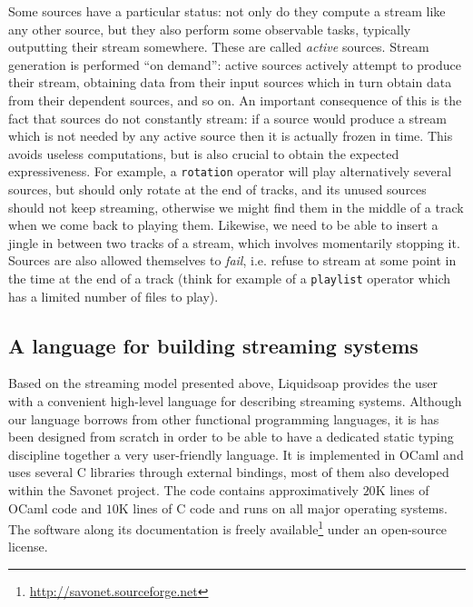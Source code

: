 \documentclass{llncs}
\newcommand{\liquidsoap}{Liquidsoap}
\newcommand{\savonet}{Savonet}
\newcommand{\ie}{{i.e.}}
\begin{document}
Some sources have a particular status: not only do they compute a stream like any
other source, but they also perform some observable tasks, typically outputting
their stream somewhere. These are called \emph{active} sources. Stream
generation is performed ``on demand'': active sources actively attempt to
produce their stream, obtaining data from their input sources which in turn
obtain data from their dependent sources, and so on. An important consequence of
this is the fact that sources do not constantly stream: if a source would
produce a stream which is not needed by any active source then it is actually
frozen in time. This avoids useless computations, but is also crucial to obtain
the expected expressiveness. For example, a \texttt{rotation} operator will play
alternatively several sources, but should only rotate at the end of tracks, and
its unused sources should not keep streaming, otherwise we might find them in
the middle of a track when we come back to playing them. Likewise, we need to be
able to insert a jingle in between two tracks of a stream, which involves
momentarily stopping it. Sources are also allowed themselves to \emph{fail},
\ie{} refuse to stream at some point in the time at the end of a track (think
for example of a \texttt{playlist} operator which has a limited number of files
to play).

\subsection{A language for building streaming systems}

Based on the streaming model presented above, \liquidsoap{} provides the user
with a convenient high-level language for describing streaming systems.
Although our language borrows from other functional programming languages, it is
has been designed from scratch in order to be able to have a dedicated static
typing discipline together a very user-friendly language. 
It is implemented in OCaml and uses several C libraries 
through external bindings, most of them also developed within the 
\savonet{} project. The code contains approximatively $20$K lines of
OCaml code and $10$K lines of C code and runs on all major operating systems.
The software along its documentation is freely
available\footnote{\url{http://savonet.sourceforge.net}} under an open-source
license.
\end{document}
